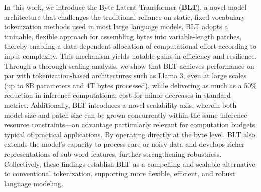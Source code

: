 In this work, we introduce the Byte Latent Transformer (\textbf{BLT}), a novel model architecture that challenges the traditional reliance on static, fixed-vocabulary tokenization methods used in most large language models. {\textsc BLT} adopts a trainable, flexible approach for assembling bytes into variable-length patches, thereby enabling a data-dependent allocation of computational effort according to input complexity. This mechanism yields notable gains in efficiency and resilience. Through a thorough scaling analysis, we show that {\textsc BLT} achieves performance on par with tokenization-based architectures such as Llama 3, even at large scales (up to 8B parameters and 4T bytes processed), while delivering as much as a 50\% reduction in inference computational cost for minor decreases in standard metrics. Additionally, {\textsc BLT} introduces a novel scalability axis, wherein both model size and patch size can be grown concurrently within the same inference resource constraints—an advantage particularly relevant for computation budgets typical of practical applications. By operating directly at the byte level, {\textsc BLT} also extends the model’s capacity to process rare or noisy data and develops richer representations of sub-word features, further strengthening robustness. Collectively, these findings establish {\textsc BLT} as a compelling and scalable alternative to conventional tokenization, supporting more flexible, efficient, and robust language modeling.

